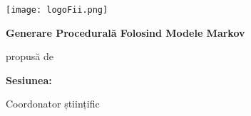 \begin{titlepage}
    \begin{center}
        \large
        \MakeUppercase{\university}
        
        \LARGE
        \textbf{\MakeUppercase{\faculty}}
        
        \vspace{1cm}
        \texttt{[image: logoFii.png]}
        
        \vspace{1cm}
        \Large
        \MakeUppercase{\thesistype}
        
        \vspace{0.5cm}
        \LARGE
        \textbf{Generare Procedurală \linebreak  Folosind Modele Markov}
        
        \vspace{2cm}
        \Large
        propusă de
        
        \vspace{0.5cm}
        \LARGE
        \textbf{\authornamefl}
        
        \vfill
        \Large
        \textbf{Sesiunea:} \session
        
        \vspace{2cm}
        \Large
        Coordonator științific
        
        \vspace{0.5cm}
        \LARGE
        \textbf{\coordinator}
    \end{center}
\end{titlepage}